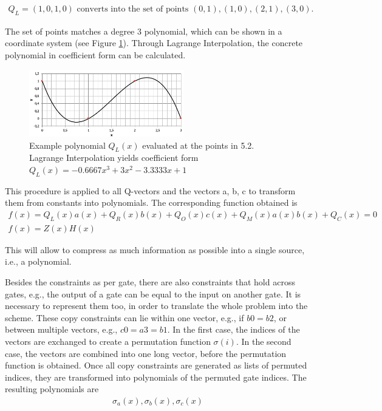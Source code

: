 \begin{align}
    Q_L = (1,0,1,0) \text{ converts into the set of points } {(0,1), (1,0), (2,1), (3,0)}.
\end{align}

The set of points matches a degree 3 polynomial, which can be shown in a coordinate system (see Figure \ref{fig:examplepoly}). Through Lagrange Interpolation, the concrete polynomial in coefficient form can be calculated. 
\begin{figure}[hbt]
	\centering
	\includegraphics[width=0.6\textwidth]{Pictures/example_polynomial.png}
	\caption{Example polynomial \(Q_{L}(x)\) evaluated at the points in 5.2. Lagrange Interpolation yields coefficient form \(Q_{L}(x) = - 0.6667x^3 + 3x^2 - 3.3333x + 1\)}
	\label{fig:examplepoly}
\end{figure}

This procedure is applied to all Q-vectors and the vectors a, b, c to transform them from constants into polynomials. The corresponding function obtained is
\begin{align}
    f(x) = Q_{L}(x)a(x) + Q_{R}(x)b(x) + Q_{O}(x)c(x) + Q_{M}(x)a(x)b(x) + Q_{C}(x) = 0\\
    f(x) = Z(x)H(x)
\end{align}

This will allow to compress as much information as possible into a single source, i.e., a polynomial. 

Besides the constraints as per gate, there are also constraints that hold across gates, e.g., the output of a gate can be equal to the input on another gate. It is necessary to represent them too, in order to translate the whole problem into the scheme. These copy constraints can lie within one vector, e.g., if \(b0 = b2\), or between multiple vectors, e.g., \(c0 = a3 = b1\). In the first case, the indices of the vectors are exchanged to create a permutation function \(\sigma(i)\). In the second case, the vectors are combined into one long vector, before the permutation function is obtained. Once all copy constraints are generated as lists of permuted indices, they are transformed into polynomials of the permuted gate indices. The resulting polynomials are
\begin{align}
    \sigma_{a}(x), \sigma_{b}(x), \sigma_{c}(x)
\end{align}

